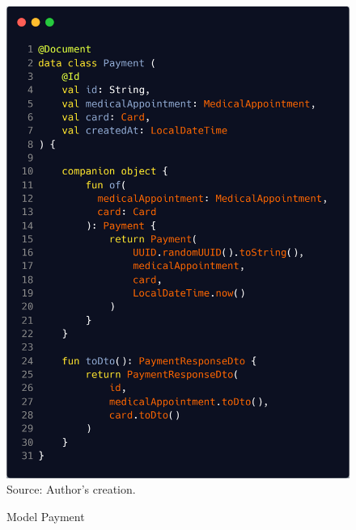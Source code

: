 \begin{figure}[HContext]
	\centering
	\caption{Model Payment}
	\includegraphics[width=1\linewidthContext]{figures/payment}
	\label{fig:payment}
	\footnotesize Source: Author's creation.
\end{figure}
